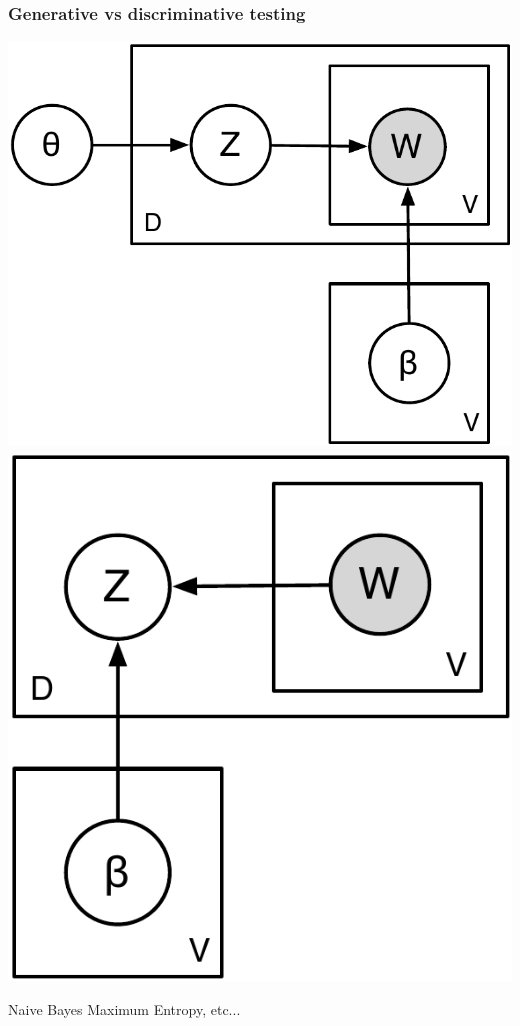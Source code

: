 \documentclass[11pt,compress,professionalfonts]{beamer}
\begin{document}
\begin{frame}[t,fragile]\frametitle{Generative vs discriminative testing}

\centerline{\includegraphics[scale=.4]{pictures/unsupervised-classification-test} \hfill \includegraphics[scale=.4]{pictures/supervised-classification-test}}

Naive Bayes \hfill Maximum Entropy, etc...

\end{frame}
\end{document}
